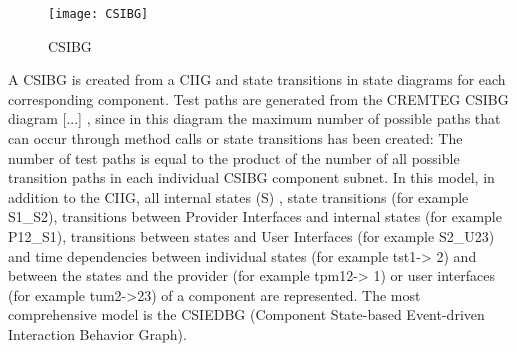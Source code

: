 \begin{figure}[H]
\begin{centering}
\texttt{[image: CSIBG]} 
\par\end{centering}
\caption{CSIBG \cite{Guan2015}}
\end{figure}
\textquotedbl A CSIBG is created from a CIIG and state transitions
in state diagrams for each corresponding component. Test paths are
generated from the CREMTEG CSIBG diagram {[}...{]}\textquotedbl{} \cite{Guan2015},
since in this diagram the maximum number of possible paths that can
occur through method calls or state transitions has been created:
The number of test paths is equal to the product of the number of
all possible transition paths in each individual CSIBG component subnet.
In this model, in addition to the CIIG, all internal states (S) ,
state transitions (for example S1\_S2), transitions between Provider
Interfaces and internal states (for example P12\_S1), transitions
between states and User Interfaces (for example S2\_U23) and time
dependencies between individual states (for example tst1-\textgreater
2) and between the states and the provider (for example tpm12-\textgreater
1) or user interfaces (for example tum2-\textgreater 23) of a component
are represented. The most comprehensive model is the CSIEDBG (Component
State-based Event-driven Interaction Behavior Graph).

